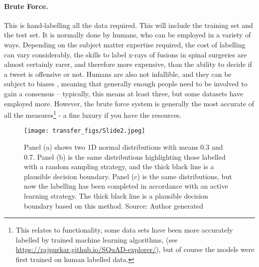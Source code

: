 \paragraph{Brute Force.} This is hand-labelling all the data required. This will include the training set and the test set. It is normally done by humans, who can be employed in a variety of ways. Depending on the subject matter expertise required, the cost of labelling can vary considerably, the skills to label x-rays of fusions in spinal surgeries are almost certainly rarer, and therefore more expensive, than the ability to decide if a tweet is offensive or not. Humans are also not infallible, and they can be subject to biases  \parencite{kahneman2011thinking}, meaning that generally enough people need to be involved to gain a consensus – typically, this means at least three, but some datasets have employed more. However, the brute force system is generally the most accurate of all the measures\footnote{This relates to  functionality, some data sets have been more accurately labelled by trained machine learning algorithms, (see \url{https://rajpurkar.github.io/SQuAD-explorer/}), but of course the models were first trained on human labelled data.}  - a fine luxury if you have the resources.

\begin{figure}
  \texttt{[image: transfer\_figs/Slide2.jpeg]}
  \caption[Pictorial example of active learning strategy.]{ Panel (a) shows two 1D normal distributions with means 0.3 and 0.7. Panel (b) is the same distributions highlighting those labelled with a random sampling strategy, and the thick black line is a plausible decision boundary. Panel (c) is the same distributions, but now the labelling has been completed in accordance with an active learning strategy. The thick black line is a plausible decision boundary based on this method. Source: Author generated}
  \label{fig:active}
\end{figure}


